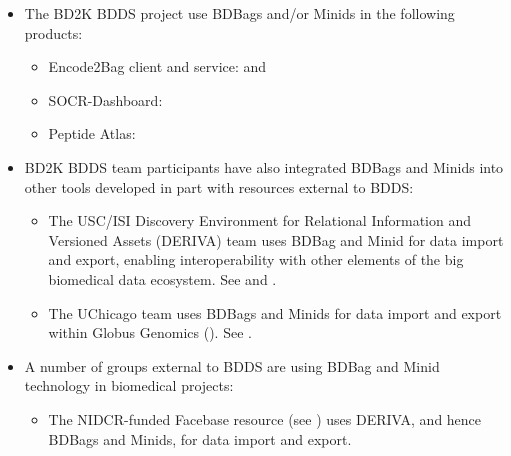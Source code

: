 \documentclass[11pt]{article}
\begin{document}
\begin{itemize}
\item
The BD2K BDDS project use BDBags and/or Minids in the following products: %

\vspace{-2ex}

\begin{itemize}
\item
Encode2Bag client and service:  and 

\item
SOCR-Dashboard: 

\item
Peptide Atlas: 
\end{itemize}

\item
BD2K BDDS team participants have also integrated BDBags and Minids into other tools 
developed in part with resources external to BDDS:

\vspace{-2ex}

\begin{itemize}
\item
The USC/ISI Discovery Environment for Relational Information and Versioned Assets (DERIVA) 
team uses BDBag and Minid for data import and export, enabling interoperability with other elements of the big biomedical data ecosystem. See  and .
\item
The UChicago team uses BDBags and Minids for data import and export within Globus Genomics 
(). See .
\end{itemize}

\item
A number of groups external to BDDS are using BDBag and Minid technology in biomedical projects:

\vspace{-2ex}

\begin{itemize}
\item
The NIDCR-funded Facebase resource (see ) uses DERIVA, and hence BDBags and Minids, for data import and export.


\end{itemize}
\end{itemize}
\end{document}
